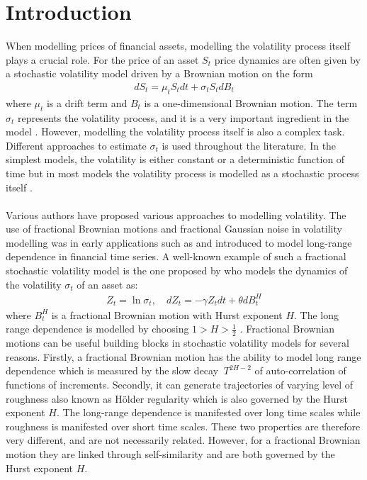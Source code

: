 \documentclass{article}
\begin{document}
\tableofcontents
\newpage
{}
\section{Introduction}
When modelling prices of financial assets, modelling the volatility process itself plays a crucial role. For the price of an asset $S_t$ price dynamics are often given by a stochastic volatility model driven by a Brownian motion on the form
\begin{align}
dS_t = \mu_tS_t dt+\sigma_tS_t dB_t \label{eq:price_gen}
\end{align}
where $\mu_t$ is a drift term and $B_t$ is a one-dimensional Brownian motion. The term $\sigma_t$ represents the volatility process, and it is a very important ingredient in the model . However, modelling the volatility process itself is also a complex task. Different approaches to estimate $\sigma_t$ is used throughout the literature. In the simplest models, the volatility is either constant or a deterministic function of time but in most models the volatility process is modelled as a stochastic process itself \cite{gatheral}. \\\\
Various authors have proposed various approaches to modelling volatility. The use of fractional Brownian motions and fractional Gaussian noise in volatility modelling was in early applications such as \cite{Bollerslev} and \cite{comte} introduced to model long-range dependence in financial time series. A well-known example of such a fractional stochastic volatility model is the one proposed by \cite{comte} who models the dynamics of the volatility $\sigma_t$ of an asset as:
\begin{align*}
Z_t = \ln\sigma_t, \quad dZ_t = -\gamma Z_t dt+\theta dB^H_t
\end{align*}
where $B^H_t$ is a fractional Brownian motion with Hurst exponent $H$. The long range dependence is modelled by choosing $1>H>\frac{1}{2}$ \cite{comte}. Fractional Brownian motions can be useful building blocks in stochastic volatility models for several reasons. Firstly, a fractional Brownian motion has the ability to model long range dependence which is measured by the slow decay $~T^{2H-2}$ of auto-correlation of functions of increments. Secondly, it can generate trajectories of varying level of roughness also known as Hölder regularity which is also governed by the Hurst exponent $H$. The long-range dependence is manifested over long time scales while roughness is manifested over short time scales. These two properties are therefore very different, and are not necessarily related. However, for a fractional Brownian motion they are linked through self-similarity and are both governed by the Hurst exponent $H$.\\\\
\end{document}
